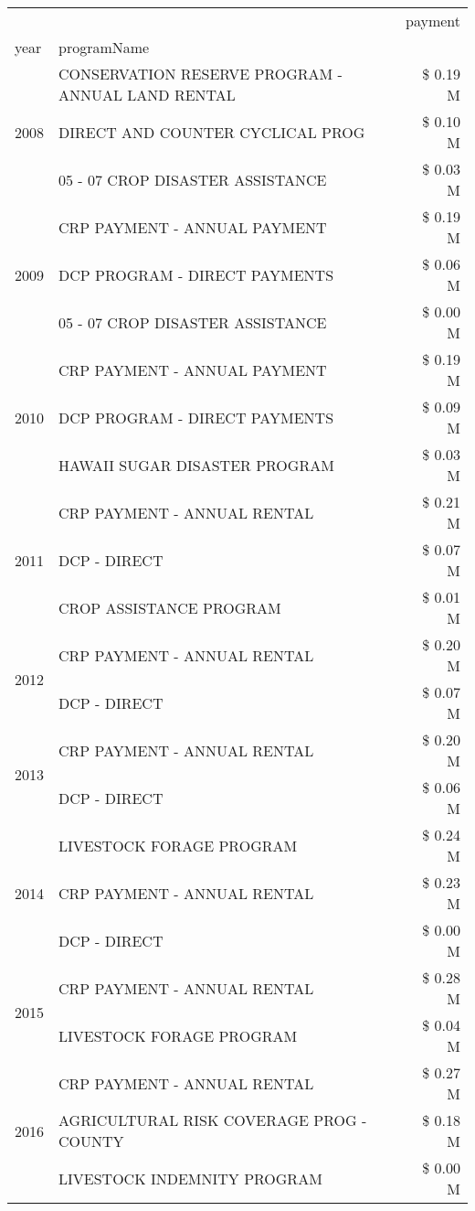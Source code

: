 \begin{tabular}{llr}
\toprule
 &  & payment \\
year & programName &  \\
\midrule
\multirow[t]{3}{*}{2008} & CONSERVATION RESERVE PROGRAM - ANNUAL LAND RENTAL & \$ 0.19 M \\
 & DIRECT AND COUNTER CYCLICAL PROG & \$ 0.10 M \\
 & 05 - 07 CROP DISASTER ASSISTANCE & \$ 0.03 M \\
\cline{1-3}
\multirow[t]{3}{*}{2009} & CRP PAYMENT - ANNUAL PAYMENT & \$ 0.19 M \\
 & DCP PROGRAM - DIRECT PAYMENTS & \$ 0.06 M \\
 & 05 - 07 CROP DISASTER ASSISTANCE & \$ 0.00 M \\
\cline{1-3}
\multirow[t]{3}{*}{2010} & CRP PAYMENT - ANNUAL PAYMENT & \$ 0.19 M \\
 & DCP PROGRAM - DIRECT PAYMENTS & \$ 0.09 M \\
 & HAWAII SUGAR DISASTER PROGRAM & \$ 0.03 M \\
\cline{1-3}
\multirow[t]{3}{*}{2011} & CRP PAYMENT - ANNUAL RENTAL & \$ 0.21 M \\
 & DCP - DIRECT & \$ 0.07 M \\
 & CROP ASSISTANCE PROGRAM & \$ 0.01 M \\
\cline{1-3}
\multirow[t]{2}{*}{2012} & CRP PAYMENT - ANNUAL RENTAL & \$ 0.20 M \\
 & DCP - DIRECT & \$ 0.07 M \\
\cline{1-3}
\multirow[t]{2}{*}{2013} & CRP PAYMENT - ANNUAL RENTAL & \$ 0.20 M \\
 & DCP - DIRECT & \$ 0.06 M \\
\cline{1-3}
\multirow[t]{3}{*}{2014} & LIVESTOCK FORAGE PROGRAM & \$ 0.24 M \\
 & CRP PAYMENT - ANNUAL RENTAL & \$ 0.23 M \\
 & DCP - DIRECT & \$ 0.00 M \\
\cline{1-3}
\multirow[t]{2}{*}{2015} & CRP PAYMENT - ANNUAL RENTAL & \$ 0.28 M \\
 & LIVESTOCK FORAGE PROGRAM & \$ 0.04 M \\
\cline{1-3}
\multirow[t]{3}{*}{2016} & CRP PAYMENT - ANNUAL RENTAL                   & \$ 0.27 M \\
 & AGRICULTURAL RISK COVERAGE PROG - COUNTY      & \$ 0.18 M \\
 & LIVESTOCK INDEMNITY PROGRAM                   & \$ 0.00 M \\

\end{tabular}
